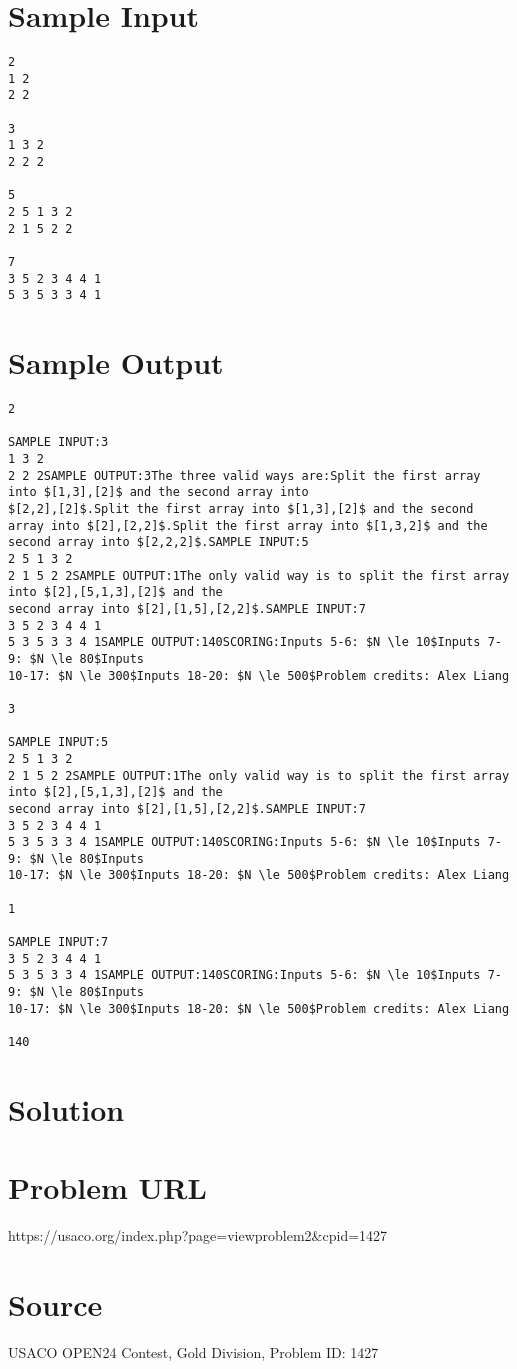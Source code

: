 \documentclass[12pt]{article}
\begin{document}
\section*{Sample Input}
\begin{verbatim}
2
1 2
2 2

3
1 3 2
2 2 2

5
2 5 1 3 2
2 1 5 2 2

7
3 5 2 3 4 4 1
5 3 5 3 3 4 1
\end{verbatim}

\section*{Sample Output}
\begin{verbatim}
2

SAMPLE INPUT:3
1 3 2
2 2 2SAMPLE OUTPUT:3The three valid ways are:Split the first array into $[1,3],[2]$ and the second array into
$[2,2],[2]$.Split the first array into $[1,3],[2]$ and the second
array into $[2],[2,2]$.Split the first array into $[1,3,2]$ and the
second array into $[2,2,2]$.SAMPLE INPUT:5
2 5 1 3 2
2 1 5 2 2SAMPLE OUTPUT:1The only valid way is to split the first array into $[2],[5,1,3],[2]$ and the 
second array into $[2],[1,5],[2,2]$.SAMPLE INPUT:7
3 5 2 3 4 4 1
5 3 5 3 3 4 1SAMPLE OUTPUT:140SCORING:Inputs 5-6: $N \le 10$Inputs 7-9: $N \le 80$Inputs
10-17: $N \le 300$Inputs 18-20: $N \le 500$Problem credits: Alex Liang

3

SAMPLE INPUT:5
2 5 1 3 2
2 1 5 2 2SAMPLE OUTPUT:1The only valid way is to split the first array into $[2],[5,1,3],[2]$ and the 
second array into $[2],[1,5],[2,2]$.SAMPLE INPUT:7
3 5 2 3 4 4 1
5 3 5 3 3 4 1SAMPLE OUTPUT:140SCORING:Inputs 5-6: $N \le 10$Inputs 7-9: $N \le 80$Inputs
10-17: $N \le 300$Inputs 18-20: $N \le 500$Problem credits: Alex Liang

1

SAMPLE INPUT:7
3 5 2 3 4 4 1
5 3 5 3 3 4 1SAMPLE OUTPUT:140SCORING:Inputs 5-6: $N \le 10$Inputs 7-9: $N \le 80$Inputs
10-17: $N \le 300$Inputs 18-20: $N \le 500$Problem credits: Alex Liang

140
\end{verbatim}

\section*{Solution}


\section*{Problem URL}
https://usaco.org/index.php?page=viewproblem2&cpid=1427

\section*{Source}
USACO OPEN24 Contest, Gold Division, Problem ID: 1427
\end{document}
